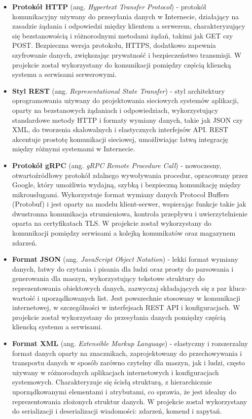 \begin{itemize}

    \item \textbf{Protokół HTTP} (ang. \textit{Hypertext Transfer Protocol}) - protokół komunikacyjny używany do przesyłania danych w Internecie, działający na zasadzie żądania i odpowiedzi między klientem a serwerem, charakteryzujący się bezstanowością i różnorodnymi metodami żądań, takimi jak GET czy POST. Bezpieczna wersja protokołu, HTTPS, dodatkowo zapewnia szyfrowanie danych, zwiększając prywatność i bezpieczeństwo transmisji. W projekcie został wykorzystany do komunikacji pomiędzy częścią kliencką systemu a serwisami serwerowymi.

    \item \textbf{Styl REST} (ang. \textit{Representational State Transfer}) - styl architektury oprogramowania używany do projektowania sieciowych systemów aplikacji, oparty na bezstanowych żądaniach i odpowiedziach, wykorzystujący standardowe metody HTTP i formaty wymiany danych, takie jak JSON czy XML, do tworzenia skalowalnych i elastycznych interfejsów API. REST akcentuje prostotę komunikacji sieciowej, umożliwiając łatwą integrację między różnymi systemami w Internecie.
    
    \item \textbf{Protokół gRPC} (ang. \textit{gRPC Remote Procedure Call}) - nowoczesny, otwartoźródłowy protokół zdalnego wywoływania procedur, opracowany przez Google, który umożliwia wydajną, szybką i bezpieczną komunikację między mikrousługami. Wykorzystuje format wymiany danych Protocol Buffers (Protobuf) i jest oparty na modelu klient-serwer, wspierając funkcje takie jak dwustronna komunikacja strumieniowa, kontrola przepływu i uwierzytelnienie oparta na certyfikatach TLS. W projekcie został wykorzystany do komunikacji pomiędzy serwisami a kolejką komunikatów oraz magazynem zdarzeń.

    \item \textbf{Format JSON} \cite{json} (ang. \textit{JavaScript Object Notation}) - lekki format wymiany danych, łatwy do czytania i pisania dla ludzi oraz prosty do parsowania i generowania dla maszyn, wykorzystujący tekstowe struktury do reprezentowania obiektowych danych, zazwyczaj składających się z par klucz-wartość i uporządkowanych list. Jest powszechnie stosowany w komunikacji internetowej, w szczególności w interfejsach REST API i konfiguracjach. W projekcie został wykorzystany do przesyłania danych pomiędzy częścią kliencką systemu a serwisami.
    
    \item \textbf{Format XML} (ang. \textit{Extensible Markup Language}) - elastyczny i rozszerzalny format danych oparty na znacznikach, zaprojektowany do przechowywania i transportu danych w sposób zarówno czytelny dla maszyn, jak i ludzi, często używany w różnorodnych aplikacjach internetowych i konfiguracjach systemowych. Charakteryzuje się ścisłą strukturą, z hierarchicznie uporządkowanymi elementami i atrybutami, co sprawia, że jest idealny do reprezentowania złożonych struktur danych. W projekcie został wykorzystany do serializacji i deserializacji wiadomości: zdarzeń, komend i zapytań.

\end{itemize}

